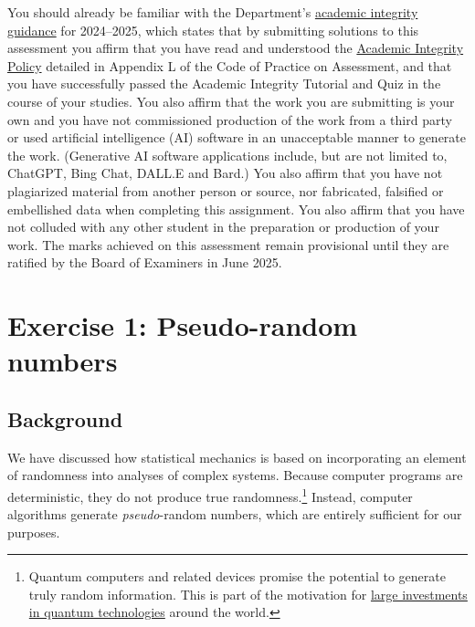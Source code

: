\documentclass[12 pt]{article} %
\begin{document}
You should already be familiar with the Department's \href{https://canvas.liverpool.ac.uk/courses/76365/files/11992667}{academic integrity guidance} for 2024--2025, which states that by submitting solutions to this assessment you affirm that you have read and understood the \href{https://www.liverpool.ac.uk/media/livacuk/tqsd/code-of-practice-on-assessment/appendix_L_cop_assess.pdf}{Academic Integrity Policy} detailed in Appendix L of the Code of Practice on Assessment, and that you have successfully passed the Academic Integrity Tutorial and Quiz in the course of your studies.
You also affirm that the work you are submitting is your own and you have not commissioned production of the work from a third party or used artificial intelligence (AI) software in an unacceptable manner to generate the work.
(Generative AI software applications include, but are not limited to, ChatGPT, Bing Chat, DALL.E and Bard.)
You also affirm that you have not plagiarized material from another person or source, nor fabricated, falsified or embellished data when completing this assignment.
You also affirm that you have not colluded with any other student in the preparation or production of your work.
The marks achieved on this assessment remain provisional until they are ratified by the Board of Examiners in June 2025.



\vfill %
\section*{Exercise 1: Pseudo-random numbers}
\subsection*{Background}
We have discussed how statistical mechanics is based on incorporating an element of randomness into analyses of complex systems.
Because computer programs are deterministic, they do not produce true randomness.\footnote{Quantum computers and related devices promise the potential to generate truly random information.  This is part of the motivation for \href{https://uknqt.ukri.org}{large investments in quantum technologies} around the world.}
Instead, computer algorithms generate \textit{pseudo}-random numbers, which are entirely sufficient for our purposes.
\end{document}
